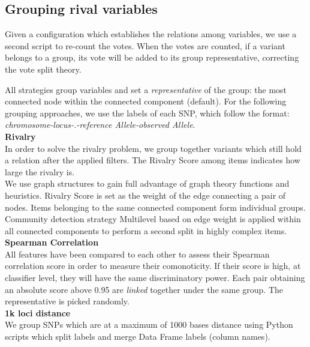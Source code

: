 \subsection{Grouping rival variables}
Given a configuration which establishes the relations among variables, we use a second script to re-count the votes. When the votes are counted, if a variant belongs to a group, its vote will be added to its group representative, correcting the vote split theory. 

All strategies group variables and set a \textit{representative} of the group: the most connected node within the connected component (default). For the following grouping approaches, we use the labels of each SNP, which follow the format: \emph{chromosome-locus-.-reference Allele-observed Allele}.
\\

\textbf{Rivalry}\\
In order to solve the rivalry problem, we group together variants which still hold a relation after the applied filters. The Rivalry Score among items indicates how large the rivalry is.
\\

We use graph structures to gain full advantage of graph theory functions and heuristics. Rivalry Score is set as the weight of the edge connecting a pair of nodes. 
Items belonging to the same connected component form individual groups. Community detection strategy Multilevel \cite{Blondel2008FastNetworks} based on edge weight is applied within all connected components to perform a second split in highly complex items.
\\

\textbf{Spearman Correlation}\\
All features have been compared to each other to assess their Spearman correlation score in order to measure their comonoticity. If their score is high, at classifier level, they will have the same discriminatory power. Each pair obtaining an absolute score above 0.95 are \emph{linked} together under the same group. The representative is picked randomly.
\\

\textbf{1k loci distance}\\
We group SNPs which are at a maximum of 1000 bases distance using Python scripts which split labels and merge Data Frame labels (column names).
\\

